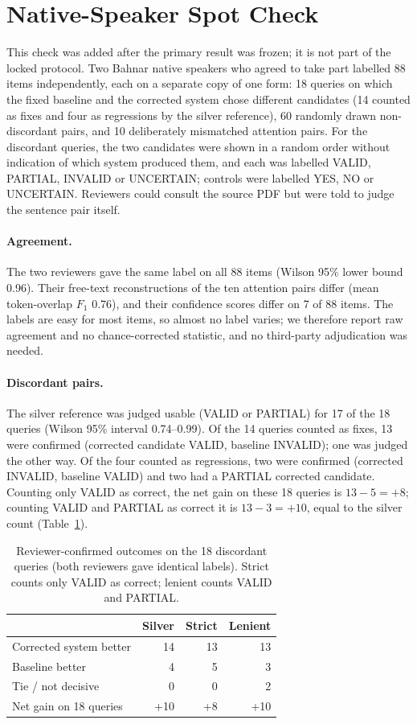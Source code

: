 \section{Native-Speaker Spot Check}\label{sec:human}
This check was added after the primary result was frozen; it is not part of the locked protocol. Two Bahnar native speakers who agreed to take part labelled 88 items independently, each on a separate copy of one form: 18 queries on which the fixed baseline and the corrected system chose different candidates (14 counted as fixes and four as regressions by the silver reference), 60 randomly drawn non-discordant pairs, and 10 deliberately mismatched attention pairs. For the discordant queries, the two candidates were shown in a random order without indication of which system produced them, and each was labelled VALID, PARTIAL, INVALID or UNCERTAIN; controls were labelled YES, NO or UNCERTAIN. Reviewers could consult the source PDF but were told to judge the sentence pair itself.

\paragraph{Agreement.} The two reviewers gave the same label on all 88 items (Wilson 95\% lower bound 0.96). Their free-text reconstructions of the ten attention pairs differ (mean token-overlap $F_1$ 0.76), and their confidence scores differ on 7 of 88 items. The labels are easy for most items, so almost no label varies; we therefore report raw agreement and no chance-corrected statistic, and no third-party adjudication was needed.

\paragraph{Discordant pairs.} The silver reference was judged usable (VALID or PARTIAL) for 17 of the 18 queries (Wilson 95\% interval 0.74--0.99). Of the 14 queries counted as fixes, 13 were confirmed (corrected candidate VALID, baseline INVALID); one was judged the other way. Of the four counted as regressions, two were confirmed (corrected INVALID, baseline VALID) and two had a PARTIAL corrected candidate. Counting only VALID as correct, the net gain on these 18 queries is $13-5=+8$; counting VALID and PARTIAL as correct it is $13-3=+10$, equal to the silver count (Table~\ref{tab:human}).

\begin{table}[t]
\centering\small
\caption{Reviewer-confirmed outcomes on the 18 discordant queries (both reviewers gave identical labels). Strict counts only VALID as correct; lenient counts VALID and PARTIAL.}
\label{tab:human}
\begin{tabular}{lrrr}
\toprule
 & Silver & Strict & Lenient \\
\midrule
Corrected system better & 14 & 13 & 13 \\
Baseline better & 4 & 5 & 3 \\
Tie / not decisive & 0 & 0 & 2 \\
\midrule
Net gain on 18 queries & +10 & +8 & +10 \\
\bottomrule
\end{tabular}
\end{table}


